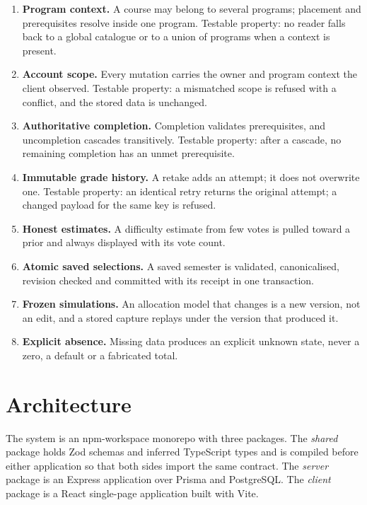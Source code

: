 \begin{enumerate}
  \item \textbf{Program context.} A course may belong to several programs; placement and
        prerequisites resolve inside one program. Testable property: no reader falls back to a
        global catalogue or to a union of programs when a context is present.
  \item \textbf{Account scope.} Every mutation carries the owner and program context the client
        observed. Testable property: a mismatched scope is refused with a conflict, and the stored
        data is unchanged.
  \item \textbf{Authoritative completion.} Completion validates prerequisites, and uncompletion
        cascades transitively. Testable property: after a cascade, no remaining completion has an
        unmet prerequisite.
  \item \textbf{Immutable grade history.} A retake adds an attempt; it does not overwrite one.
        Testable property: an identical retry returns the original attempt; a changed payload for
        the same key is refused.
  \item \textbf{Honest estimates.} A difficulty estimate from few votes is pulled toward a prior
        and always displayed with its vote count.
  \item \textbf{Atomic saved selections.} A saved semester is validated, canonicalised, revision
        checked and committed with its receipt in one transaction.
  \item \textbf{Frozen simulations.} An allocation model that changes is a new version, not an
        edit, and a stored capture replays under the version that produced it.
  \item \textbf{Explicit absence.} Missing data produces an explicit unknown state, never a zero,
        a default or a fabricated total.
\end{enumerate}

\section{Architecture}

The system is an npm-workspace monorepo with three packages. The {\em shared} package holds Zod
schemas and inferred TypeScript types and is compiled before either application so that both sides
import the same contract. The {\em server} package is an Express application over Prisma and
PostgreSQL. The {\em client} package is a React single-page application built with Vite.


